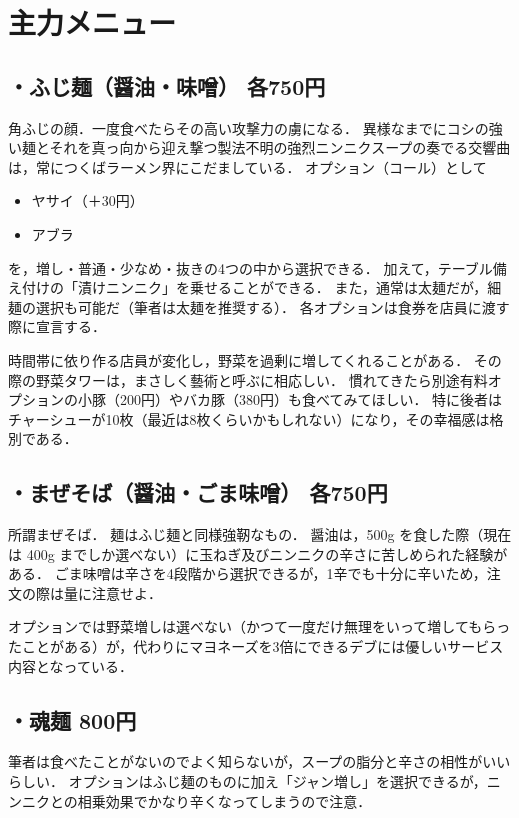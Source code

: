 \documentclass[uplatex]{jsarticle}
\begin{document}
 \section{主力メニュー}

  \subsection*{・ふじ麺（醤油・味噌） 各750円}
  角ふじの顔．一度食べたらその高い攻撃力の虜になる．
  異様なまでにコシの強い麺とそれを真っ向から迎え撃つ製法不明の強烈ニンニクスープの奏でる交響曲は，常につくばラーメン界にこだましている．
  オプション（コール）として
  \begin{itemize}
   \item ヤサイ（＋30円）
   \item アブラ
  \end{itemize}
  を，増し・普通・少なめ・抜きの4つの中から選択できる．
  加えて，テーブル備え付けの「漬けニンニク」を乗せることができる．
  また，通常は太麺だが，細麺の選択も可能だ（筆者は太麺を推奨する）．
  各オプションは食券を店員に渡す際に宣言する．
  
  時間帯に依り作る店員が変化し，野菜を過剰に増してくれることがある．
  その際の野菜タワーは，まさしく藝術と呼ぶに相応しい．
  慣れてきたら別途有料オプションの小豚（200円）やバカ豚（380円）も食べてみてほしい．
  特に後者はチャーシューが10枚（最近は8枚くらいかもしれない）になり，その幸福感は格別である．

  \subsection*{・まぜそば（醤油・ごま味噌） 各750円}
  所謂まぜそば．
  麺はふじ麺と同様強靭なもの．
  醤油は，500g を食した際（現在は 400g までしか選べない）に玉ねぎ及びニンニクの辛さに苦しめられた経験がある．
  ごま味噌は辛さを4段階から選択できるが，1辛でも十分に辛いため，注文の際は量に注意せよ．

  オプションでは野菜増しは選べない（かつて一度だけ無理をいって増してもらったことがある）が，代わりにマヨネーズを3倍にできるデブには優しいサービス内容となっている．

  \subsection*{・魂麺 800円}
  筆者は食べたことがないのでよく知らないが，スープの脂分と辛さの相性がいいらしい．
  オプションはふじ麺のものに加え「ジャン増し」を選択できるが，ニンニクとの相乗効果でかなり辛くなってしまうので注意．
\end{document}
